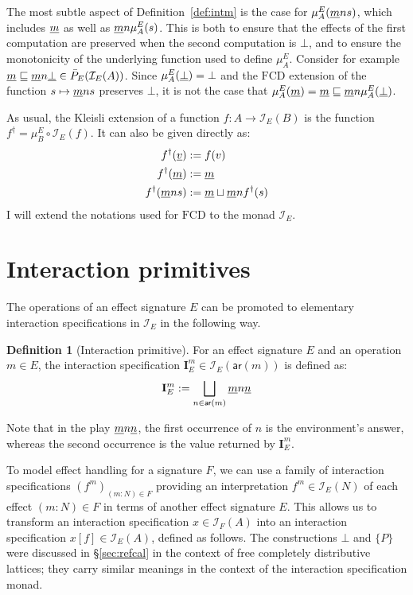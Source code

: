 \documentclass[11pt,oneside]{book}
\theoremstyle{definition}
\newtheorem{definition}[theorem]{Definition}
\newcommand{\kw}[1]{\ensuremath{ \mathsf{#1} }}
\newcommand{\ul}[1]{%
  \underline{\smash{#1}}
}
\begin{document}

The most subtle aspect of Definition~\ref{def:intm}
is the case for $\mu^E_A(\ul{m} n s)$,
which includes $\ul{m}$ as well as $\ul{m} n \mu^E_A(s)$.
This is both
to ensure that the effects of the first computation are preserved
when the second computation is $\bot$, and
to ensure the monotonicity of the underlying function
used to define $\mu^E_A$.
Consider for example
$\ul{m} \sqsubseteq
 \ul{m} n \ul{\bot} \in \bar{P}_E(\mathcal{I}_E(A))$.
Since $\mu^E_A(\ul{\bot}) = \bot$ and
the $\mathrm{FCD}$ extension
of the function $s \mapsto \ul{m} n s$
preserves $\bot$,
it is not the case that
$\mu^E_A(\ul{m}) = \ul{m} \sqsubseteq
 \ul{m} n \mu^E_A(\ul{\bot})$.

As usual,
the Kleisli extension of a function $f : A \rightarrow \mathcal{I}_E(B)$
is the function $f^\dagger = \mu^E_B \circ \mathcal{I}_E(f)$.
It can also be given directly as:
\begin{align*}
  f^\dagger(\ul{v}) &:= f(v) \\
  f^\dagger(\ul{m}) &:= \ul{m} \\
  f^\dagger(\ul{m} n s) &:=
    \ul{m} \sqcup \ul{m} n f^\dagger(s)
\end{align*}
I will extend the notations used for $\mathrm{FCD}$
to the monad $\mathcal{I}_E$.


\section{Interaction primitives} %

The operations of an effect signature $E$
can be promoted to elementary interaction specifications in $\mathcal{I}_E$
in the following way.

\begin{definition}[Interaction primitive]
For an effect signature $E$ and
an operation $m \in E$,
the interaction specification
$\mathbf{I}_E^m \in \mathcal{I}_E(\kw{ar}(m))$
is defined as:
\[
  \mathbf{I}_E^m :=
    \bigsqcup_{n \in \kw{ar}(m)} \ul{m} n \ul{n}
\]
\end{definition}
Note that in the play $\ul{m} n \ul{n}$,
the first occurrence of $n$ is the environment's answer,
whereas the second occurrence is the value returned by $\mathbf{I}_E^m$.

To model effect handling for a signature $F$,
we can use a family of interaction specifications
$(f^m)_{(m \mathbin: N) \in F}$
providing an interpretation $f^m \in \mathcal{I}_E(N)$
of each effect $(m \mathbin: N) \in F$
in terms of another effect signature $E$.
This allows us to transform an interaction specification
$x \in \mathcal{I}_F(A)$
into an interaction specification
$x[f] \in \mathcal{I}_E(A)$,
defined as follows.
The constructions $\bot$ and $\{P\}$ were discussed in \S\ref{sec:refcal}
in the context of free completely distributive lattices;
they carry similar meanings in the context of the
interaction specification monad.
\end{document}
